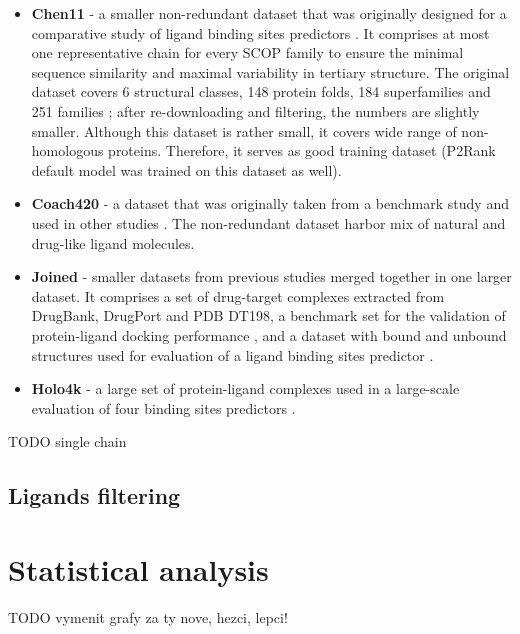 \begin{itemize}
  \item \textbf{Chen11}
  - a smaller non-redundant dataset that was originally designed for a comparative study of ligand binding sites predictors \cite{benchmark}. It comprises at most one representative chain for every SCOP family \cite{scop} to ensure the minimal sequence similarity and maximal variability in tertiary structure. The original dataset covers 6 structural classes, 148 protein folds, 184 superfamilies and 251 families \cite{benchmark}; after re-downloading and filtering, the numbers are slightly smaller. Although this dataset is rather small, it covers wide range of non-homologous proteins. Therefore, it serves as good training dataset (P2Rank default model was trained on this dataset as well).
  
  \item \textbf{Coach420}
  - a dataset that was originally taken from a benchmark study \cite{cofactor} and used in other studies \cite{coach, p2rank1}. The non-redundant dataset harbor mix of natural and drug-like ligand molecules.
  
  \item \textbf{Joined}
  - smaller datasets from previous studies merged together in one larger dataset. It comprises a set of drug-target complexes extracted from DrugBank, DrugPort and PDB DT198\cite{dt}, a benchmark set for the validation of protein-ligand docking performance \cite{astex}, and a dataset with bound and unbound structures used for evaluation of a ligand binding sites predictor \cite{ligsite}.
  
  \item \textbf{Holo4k}
  - a large set of protein-ligand complexes used in a large-scale evaluation of four binding sites predictors \cite{holo4k}.
\end{itemize}



TODO single chain

\subsection{Ligands filtering}

\section{Statistical analysis}

TODO vymenit grafy za ty nove, hezci, lepci!

